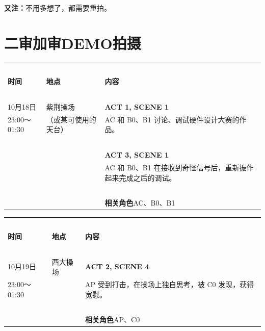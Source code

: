 \documentclass[10pt, a5paper, oneside]{memoir}
\begin{document}
{   \vspace{-0.5\baselineskip}
	\kai \small
	\textbf{又注：}不用多想了，都需要重拍。
}

\clearpage

\section*{二审加审DEMO拍摄}

\begin{table}[!ht]
	\raggedright
	\begin{tabular}{p{}p{}p{}}
		\toprule
		~ & & \\[-0.7em]
		\textbf{时间} & \textbf{地点} & \textbf{内容} \\[0.3em]
		\midrule
		~ & & \\[-0.7em]
		10月18日        & 紫荆操场 & \textbf{ACT 1, SCENE 1} \\[0.3em]
		23:00～01:30    & （或某可使用的天台） & 
			AC 和 B0、B1 讨论、调试硬件设计大赛的作品。
		\\
		~ & & \\[-0.7em]
		~ & ~ & \textbf{ACT 3, SCENE 1} \\[0.3em]
		~ & ~ & 
			AC 和 B0、B1 在接收到奇怪信号后，重新振作起来完成之后的调试。
		\\
		~ & & \\[-0.7em]
		~ & ~ & \textbf{相关角色\quad}AC、B0、B1 \\[0.3em]
		\bottomrule
	\end{tabular}
\end{table}

\begin{table}[!ht]
	\raggedright
	\begin{tabular}{p{}p{}p{}}
		\toprule
		~ & & \\[-0.7em]
		\textbf{时间} & \textbf{地点} & \textbf{内容} \\[0.3em]
		\midrule
		~ & & \\[-0.7em]
		10月19日        & 西大操场 & \textbf{ACT 2, SCENE 4} \\[0.3em]
		23:00～01:30    & ~ & 
			AP 受到打击，在操场上独自思考，被 C0 发现，获得宽慰。
		\\
		~ & & \\[-0.7em]
		~ & ~ & \textbf{相关角色\quad}AP、C0 \\[0.3em]
		\bottomrule
	\end{tabular}
\end{table}
\end{document}
